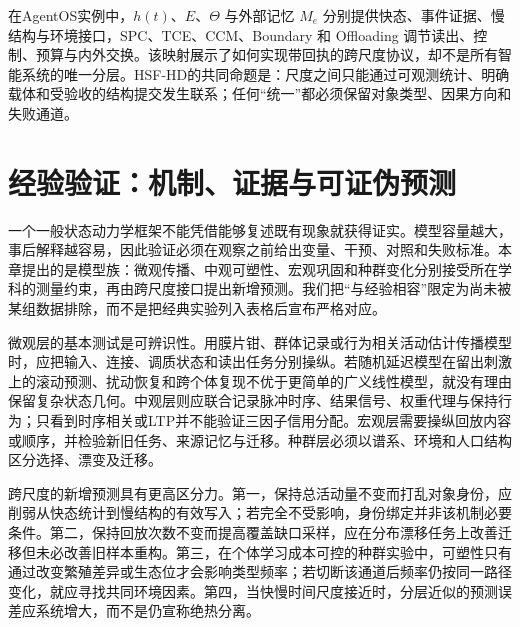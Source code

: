 在AgentOS实例中，$h(t)$、$E$、$\Theta$ 与外部记忆 $M_e$ 分别提供快态、事件证据、慢结构与环境接口，SPC、TCE、CCM、Boundary 和 Offloading 调节读出、控制、预算与内外交换。该映射展示了如何实现带回执的跨尺度协议，却不是所有智能系统的唯一分层。HSF-HD的共同命题是：尺度之间只能通过可观测统计、明确载体和受验收的结构提交发生联系；任何“统一”都必须保留对象类型、因果方向和失败通道。

\section{经验验证：机制、证据与可证伪预测}
\label{sec:empirical_consistency_biology}

一个一般状态动力学框架不能凭借能够复述既有现象就获得证实。模型容量越大，事后解释越容易，因此验证必须在观察之前给出变量、干预、对照和失败标准。本章提出的是模型族：微观传播、中观可塑性、宏观巩固和种群变化分别接受所在学科的测量约束，再由跨尺度接口提出新增预测。我们把“与经验相容”限定为尚未被某组数据排除，而不是把经典实验列入表格后宣布严格对应。

微观层的基本测试是可辨识性。用膜片钳、群体记录或行为相关活动估计传播模型时，应把输入、连接、调质状态和读出任务分别操纵。若随机延迟模型在留出刺激上的滚动预测、扰动恢复和跨个体复现不优于更简单的广义线性模型，就没有理由保留复杂状态几何。中观层则应联合记录脉冲时序、结果信号、权重代理与保持行为；只看到时序相关或LTP并不能验证三因子信用分配。宏观层需要操纵回放内容或顺序，并检验新旧任务、来源记忆与迁移。种群层必须以谱系、环境和人口结构区分选择、漂变及迁移。

跨尺度的新增预测具有更高区分力。第一，保持总活动量不变而打乱对象身份，应削弱从快态统计到慢结构的有效写入；若完全不受影响，身份绑定并非该机制必要条件。第二，保持回放次数不变而提高覆盖缺口采样，应在分布漂移任务上改善迁移但未必改善旧样本重构。第三，在个体学习成本可控的种群实验中，可塑性只有通过改变繁殖差异或生态位才会影响类型频率；若切断该通道后频率仍按同一路径变化，就应寻找共同环境因素。第四，当快慢时间尺度接近时，分层近似的预测误差应系统增大，而不是仍宣称绝热分离。

